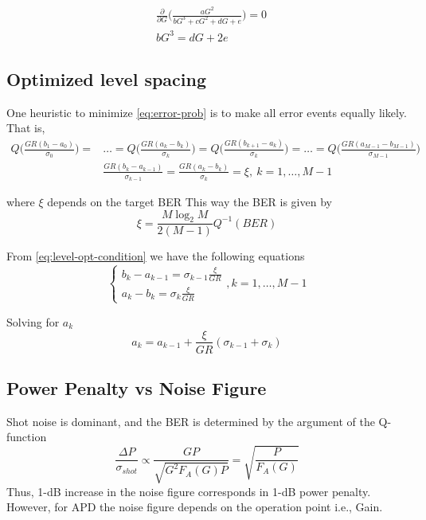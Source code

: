 \documentclass[a4paper]{article}
\begin{document}
\begin{align}
& \frac{\partial}{\partial G}\bigg(\frac{aG^2}{bG^3 + cG^2 + dG + e}\bigg) = 0 \\
& bG^3 = dG + 2e 
\end{align}

\subsection{Optimized level spacing}

One heuristic to minimize \eqref{eq:error-prob} is to make all error events equally likely. That is,
\begin{align} \label{eq:level-opt-condition} \nonumber
Q\bigg(\frac{GR(b_1 - a_0)}{\sigma_{0}}\bigg) =& \ldots = Q\bigg(\frac{GR(a_k-b_k)}{\sigma_{k}}\bigg) = Q\bigg(\frac{GR(b_{k+1}-a_k)}{\sigma_{k}}\bigg) = \ldots = Q\bigg(\frac{GR(a_{M-1}-b_{M-1})}{\sigma_{M-1}}\bigg) \\
& \frac{GR(b_k-a_{k-1})}{\sigma_{k-1}} = \frac{GR(a_{k}-b_k)}{\sigma_{k}} = \xi,~k = 1, \ldots, M-1
\end{align}

where $\xi$ depends on the target BER 
This way the BER is given by
\begin{equation}
\xi = \frac{M\log_2 M}{2(M-1)}Q^{-1}(BER)
\end{equation}

From \eqref{eq:level-opt-condition} we have the following equations
\begin{equation}
\begin{cases}
b_k - a_{k-1} = \sigma_{k-1}\frac{\xi}{GR} \\
a_k - b_k = \sigma_{k}\frac{\xi}{GR}
\end{cases}, k = 1, \ldots, M-1
\end{equation}

Solving for $a_k$
\begin{equation}
a_k = a_{k-1} + \frac{\xi}{GR}(\sigma_{k-1} + \sigma_k)
\end{equation}

\subsection{Power Penalty vs Noise Figure}

Shot noise is dominant, and the BER is determined by the argument of the Q-function
\begin{equation}
\frac{\Delta P}{\sigma_{shot}} \propto \frac{GP}{\sqrt{G^2F_A(G)P}} = \sqrt{\frac{P}{F_A(G)}}
\end{equation}
Thus, 1-dB increase in the noise figure corresponds in 1-dB power penalty. However, for APD the noise figure depends on the operation point i.e., Gain.
\end{document}

